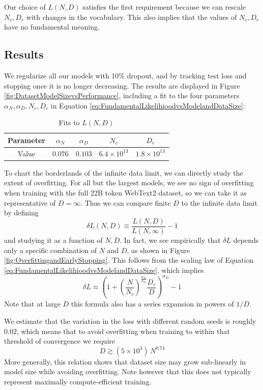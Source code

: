 \documentclass[english]{article}
\newcommand{\be}{\begin{equation}}
\newcommand{\ee}{\end{equation}}
\begin{document}
Our choice of $L(N,D)$ satisfies the first requirement because we can rescale $N_c, D_c$ with changes in the vocabulary.  This also implies that the values of $N_c, D_c$ have no fundamental meaning.

\subsection{Results}

We regularize all our models with 10\% dropout, and by tracking test loss and stopping once it is no longer decreasing.   The results are displayed in Figure \ref{fig:DatasetModelSizevsPerformance}, including a fit to the four parameters $\alpha_N, \alpha_D, N_c, D_c$ in Equation \eqref{eq:FundamentalLikelihioodvsModelandDataSize}:

\begin{table}[h!]
\centering
\vspace{-0.5em}
\begin{tabular}{|c| c | c | c | c|} 
 \hline
Parameter & $\alpha_N$ & $\alpha_D$ & $N_c$ & $D_c$ \\ [0.5ex] 
 \hline\hline
Value  & $0.076$ & $0.103$ & $6.4 \times 10^{13}$ & $1.8 \times 10^{13}$ \\ 
 \hline
\end{tabular}
\vspace{0.5em}
\caption{Fits to $L(N, D)$}
\vspace{-1em}
\end{table}

To chart the borderlands of the infinite data limit, we can directly study the extent of overfitting.  For all but the largest models, we see no sign of overfitting when training with the full 22B token WebText2 dataset, so we can take it as representative of $D=\infty$.  Thus we can compare finite $D$ to the infinite data limit by defining
\be
\delta L(N, D) \equiv \frac{L(N, D)}{L(N, \infty)} - 1
\ee
and studying it as a function of $N, D$.   In fact, we see empirically that $\delta L$ depends only a specific combination of $N$ and $D$, as shown in Figure \ref{fig:OverfittingandEarlyStopping}.  This follows from the scaling law of Equation \eqref{eq:FundamentalLikelihioodvsModelandDataSize}, which implies
\be
\label{eq:OverfittingPrediction}
\delta L \approx  \left( 1 +  \left(\frac{N}{N_c} \right)^{\frac{\alpha_N}{\alpha_D}} \frac{D_c}{D} \right)^{\alpha_D} - 1 
\ee
Note that at large $D$ this formula also has a series expansion in powers of $1/D$.

We estimate that the variation in the loss with different random seeds is roughly $0.02$, which means that to avoid overfitting when training to within that threshold of convergence we require 
\be
D \gtrsim (5 \times 10^3) \, N^{0.74}
\ee
More generally, this relation shows that dataset size may grow sub-linearly in model size while avoiding overfitting.  Note however that this does not typically represent maximally compute-efficient training.
\end{document}
